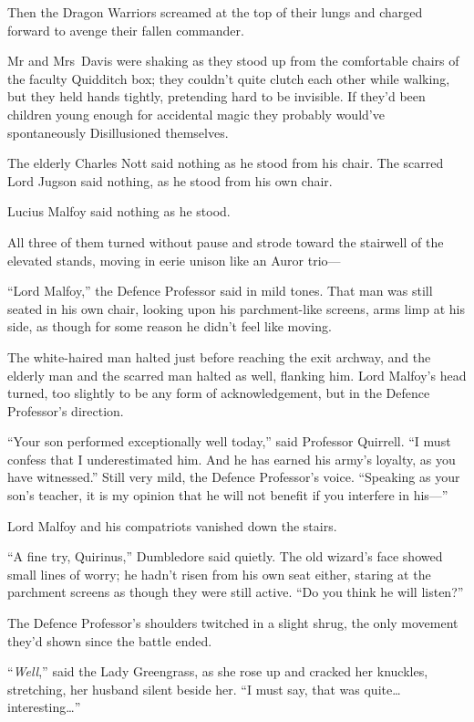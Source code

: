 Then the Dragon Warriors screamed at the top of their lungs and charged forward to avenge their fallen commander.

\later

Mr and Mrs~Davis were shaking as they stood up from the comfortable chairs of the faculty Quidditch box; they couldn’t quite clutch each other while walking, but they held hands tightly, pretending hard to be invisible. If they’d been children young enough for accidental magic they probably would’ve spontaneously Disillusioned themselves.

The elderly Charles Nott said nothing as he stood from his chair. The scarred Lord Jugson said nothing, as he stood from his own chair.

Lucius Malfoy said nothing as he stood.

All three of them turned without pause and strode toward the stairwell of the elevated stands, moving in eerie unison like an Auror trio—

“Lord Malfoy,” the Defence Professor said in mild tones. That man was still seated in his own chair, looking upon his parchment-like screens, arms limp at his side, as though for some reason he didn’t feel like moving.

The white-haired man halted just before reaching the exit archway, and the elderly man and the scarred man halted as well, flanking him. Lord Malfoy’s head turned, too slightly to be any form of acknowledgement, but in the Defence Professor’s direction.

“Your son performed exceptionally well today,” said Professor Quirrell. “I must confess that I underestimated him. And he has earned his army’s loyalty, as you have witnessed.” Still very mild, the Defence Professor’s voice. “Speaking as your son’s teacher, it is my opinion that he will not benefit if you interfere in his—”

Lord Malfoy and his compatriots vanished down the stairs.

“A fine try, Quirinus,” Dumbledore said quietly. The old wizard’s face showed small lines of worry; he hadn’t risen from his own seat either, staring at the parchment screens as though they were still active. “Do you think he will listen?”

The Defence Professor’s shoulders twitched in a slight shrug, the only movement they’d shown since the battle ended.

“\emph{Well},” said the Lady Greengrass, as she rose up and cracked her knuckles, stretching, her husband silent beside her. “I must say, that was quite…interesting…”

